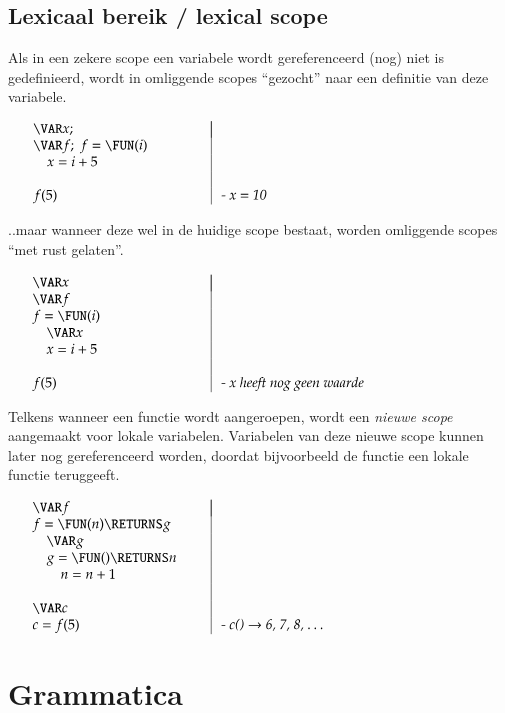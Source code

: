 \documentclass
  [11pt,
   paper=a4,
   cleardouble=plain,
   chapterprefix=true,
   parskip=half]
  {scrbook}
\makeatletter
\def\IN{\quad}
\newcommand{\<}
  {\ensuremath{\langle}}
\renewcommand{\>}
  {\ensuremath{\rangle}}
\newenvironment{SyntaxExample}{%
\vspace{-1.6pc}%
	\begin{equation*}%
		\begin{array}{l@{\hspace*{.02\textwidth}}|@{\hspace*{.02\textwidth}}l}%
		\hspace*{.35\textwidth} & \hspace*{.55\textwidth} \\[-1pc]%
}{%
		\end{array}%
	\end{equation*}%
\vspace{-.6pc}%
}
\makeatother
\begin{document}
\subsection{Lexicaal bereik / lexical scope}

Als in een zekere scope een variabele wordt gereferenceerd (nog) niet is gedefinieerd, wordt in omliggende scopes ``gezocht'' naar een definitie van deze variabele.

	\begin{SyntaxExample}
		\VAR x; \\
		\VAR f;\; f = \FUN(i) \\
		\IN x = i + 5 \\
		\\
		f(5) & \textit{- x = 10}
	\end{SyntaxExample}

..maar wanneer deze wel in de huidige scope bestaat, worden omliggende scopes ``met rust gelaten''.

	\begin{SyntaxExample}
		\VAR x \\
		\VAR f \\
		f = \FUN(i) \\
		\IN \VAR x \\
		\IN x = i + 5 \\
		\\
		f(5) & \textit{- x heeft nog geen waarde}
	\end{SyntaxExample}

Telkens wanneer een functie wordt aangeroepen, wordt een \emph{nieuwe scope} aangemaakt voor lokale variabelen. Variabelen van deze nieuwe scope kunnen later nog gereferenceerd worden, doordat bijvoorbeeld de functie een lokale functie teruggeeft.

	\begin{SyntaxExample}
		\VAR f \\
		f = \FUN(n) \RETURNS g \\
		\IN \VAR g \\
		\IN g = \FUN() \RETURNS n \\
		\IN \IN n = n + 1 \\
		\\
		\VAR c \\
		c = f(5) & \textit{- c() $\rightarrow$ 6, 7, 8, \dots}
	\end{SyntaxExample}


\section{Grammatica}
\end{document}
